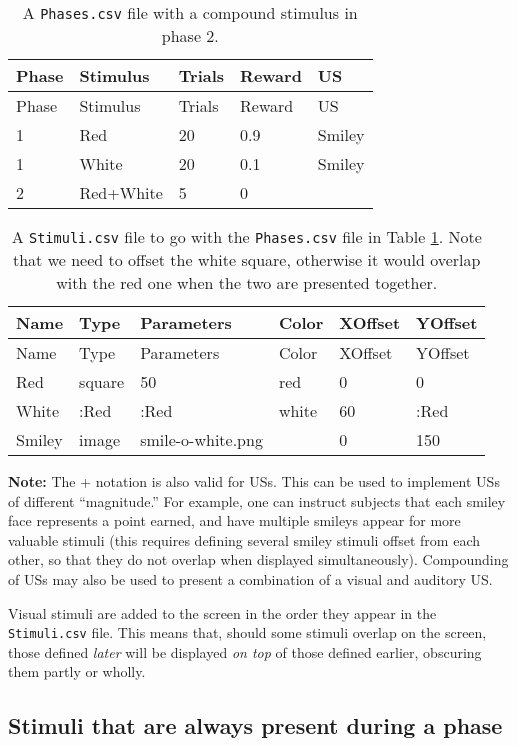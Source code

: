 \documentclass[11pt,]{article}
\begin{document}
\begin{longtable}[c]{@{}lllll@{}}
\caption{A \texttt{Phases.csv} file with a compound stimulus in phase 2.
\label{phases-plus}}\tabularnewline
\toprule
Phase & Stimulus & Trials & Reward & US\tabularnewline
\midrule
\endfirsthead
\toprule
Phase & Stimulus & Trials & Reward & US\tabularnewline
\midrule
\endhead
1 & Red & 20 & 0.9 & Smiley\tabularnewline
1 & White & 20 & 0.1 & Smiley\tabularnewline
2 & Red+White & 5 & 0 &\tabularnewline
\bottomrule
\end{longtable}

\begin{longtable}[c]{@{}llllll@{}}
\caption{A \texttt{Stimuli.csv} file to go with the \texttt{Phases.csv}
file in Table \ref{phases-plus}. Note that we need to offset the white
square, otherwise it would overlap with the red one when the two are
presented together. \label{stimuli-plus}}\tabularnewline
\toprule
Name & Type & Parameters & Color & XOffset & YOffset\tabularnewline
\midrule
\endfirsthead
\toprule
Name & Type & Parameters & Color & XOffset & YOffset\tabularnewline
\midrule
\endhead
Red & square & 50 & red & 0 & 0\tabularnewline
White & :Red & :Red & white & 60 & :Red\tabularnewline
Smiley & image & smile-o-white.png & & 0 & 150\tabularnewline
\bottomrule
\end{longtable}

\textbf{Note:} The + notation is also valid for USs. This can be used to
implement USs of different ``magnitude.'' For example, one can instruct
subjects that each smiley face represents a point earned, and have
multiple smileys appear for more valuable stimuli (this requires
defining several smiley stimuli offset from each other, so that they do
not overlap when displayed simultaneously). Compounding of USs may also
be used to present a combination of a visual and auditory US.


Visual stimuli are added to the screen in the order they appear in the
\texttt{Stimuli.csv} file. This means that, should some stimuli overlap
on the screen, those defined \emph{later} will be displayed \emph{on
top} of those defined earlier, obscuring them partly or wholly.

\subsection{Stimuli that are always present during a
phase}\label{stimuli-that-are-always-present-during-a-phase}
\end{document}
